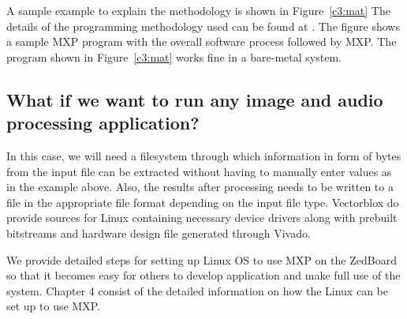 A sample example to explain the methodology is shown in Figure~\ref{c3:mat} The details of the programming methodology used can be found at \cite{20}. The figure shows a sample MXP program with the overall software process followed by MXP. The program shown in Figure~\ref{c3:mat} works fine in a bare-metal system. 

\subsection{What if we want to run any image and audio processing application?}

In this case, we will need a filesystem through which information in form of bytes from the input file can be extracted without having to manually enter values as in the example above. Also, the results after processing needs to be written to a file in the appropriate file format depending on the input file type. Vectorblox do provide sources for Linux containing necessary device drivers along with prebuilt bitstreams and hardware design file generated through Vivado.

We provide detailed steps for setting up Linux OS to use MXP on the ZedBoard so that it becomes easy for others to develop application and make full use of the system. Chapter 4 consist of the detailed information on how the Linux can be set up to use MXP.

